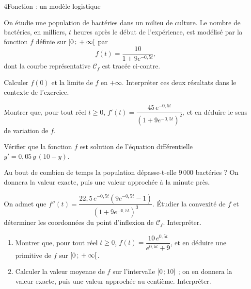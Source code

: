 \begin{exoBac}{4}{Fonction : un modèle logistique}
\begin{codecote}[0.56]
On étudie une population de bactéries dans un milieu de culture. Le nombre de bactéries, en milliers, $t$ heures après le début de
l'expérience, est modélisé par la fonction $f$ définie sur $\mathopen{[}0\,{;}\,+\infty\mathclose{[}$ par
\[f(t)=\frac{10}{1+9e^{-0{,}5t}},\]
dont la courbe représentative $\mathcal{C}_f$ est tracée ci-contre.
\begin{questions}
  \item Calculer $f(0)$ et la limite de $f$ en $+\infty$. Interpréter ces deux résultats dans le contexte de l'exercice.
\end{questions}
\cote
\centering
{}
\end{codecote}
\begin{questions}[start=2]
  \item Montrer que, pour tout réel $t\geq0$, $f'(t)=\dfrac{45\,e^{-0{,}5t}}{\left(1+9e^{-0{,}5t}\right)^{2}}$, et en déduire le sens de
    variation de $f$.
  \item Vérifier que la fonction $f$ est solution de l'équation différentielle $y'=0{,}05\,y\,(10-y)$.
  \item Au bout de combien de temps la population dépasse-t-elle $9\,000$ bactéries ? On donnera la valeur exacte, puis une valeur
    approchée à la minute près.
  \item On admet que $f''(t)=\dfrac{22{,}5\,e^{-0{,}5t}\left(9e^{-0{,}5t}-1\right)}{\left(1+9e^{-0{,}5t}\right)^{3}}$. Étudier la
    convexité de $f$ et déterminer les coordonnées du point d'inflexion de $\mathcal{C}_f$. Interpréter.
  \item \begin{enumerate}[label=\alph*),leftmargin=1.4em,itemsep=0.4mm,topsep=0.4mm]
      \item Montrer que, pour tout réel $t\geq0$, $f(t)=\dfrac{10\,e^{0{,}5t}}{e^{0{,}5t}+9}$, et en déduire une primitive de $f$ sur
        $\mathopen{[}0\,{;}\,+\infty\mathclose{[}$.
      \item Calculer la valeur moyenne de $f$ sur l'intervalle $\mathopen{[}0\,{;}\,10\mathclose{]}$ ; on en donnera la valeur exacte, puis une valeur
        approchée au centième. Interpréter.
    \end{enumerate}
\end{questions}
\end{exoBac}
